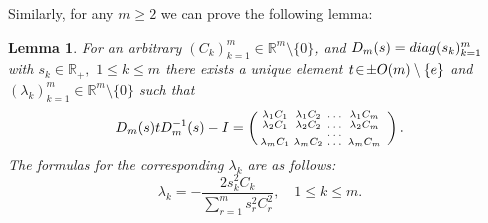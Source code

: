 \documentclass[preprint,12pt]{elsarticle}
\newtheorem{lem}[thm]{Lemma}
\numberwithin{equation}{section}
\begin{document}
Similarly, for  any $m\geq 2$ we can  prove the following lemma:
\begin{lem}
\label{l.DtD=C.m}
For an arbitrary $(C_k)_{k=1}^m\in {\mathbb R}^m\setminus\{0\}$,  and  $D_m(s)={\rm diag}(s_k)_{k=1}^m$ with 
$s_k\in \mathbb R_+,\,\,1\leq k\leq m$ 
there exists a unique  element $t\!\in \!\pm {\rm O}(m)\setminus\{e\}$  and $(\lambda_k)_{k=1}^m\in {\mathbb R}^m\setminus\{0\}$
such that 
\begin{equation}
\label{D_mtD^{-1}_m=(1,1,1)}
D_m(s)tD^{-1}_m(s)-{\rm I}=\left(\begin{smallmatrix}
\lambda_1C_1 &\lambda_1C_2 &\dots&\lambda_1C_m \\
\lambda_2C_1 &\lambda_2C_2 &\dots&\lambda_2C_m \\
&&\dots&&\\
\lambda_mC_1 &\lambda_mC_2 &\dots&\lambda_mC_m
\end{smallmatrix}
\right).
\end{equation}
The formulas for the corresponding $\lambda_k$ are as follows:
\begin{equation}
 \label{lambda.m}
\lambda_k=-\frac{2s^2_kC_k}{\sum_{r=1}^ms^2_rC^2_r},\quad 1\leq k\leq m.
\end{equation}
\end{lem}
%
\end{document}
